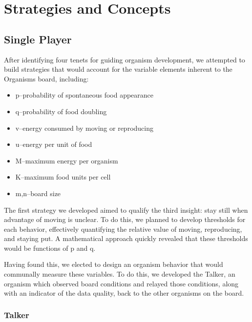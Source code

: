 \section{Strategies and Concepts}
\label{sec:strategies}

\subsection{Single Player}
After identifying four tenets for guiding organism development, we attempted to build strategies that would account for the variable elements inherent to the Organisms board, including:

\begin{itemize}
\item	p--probability of spontaneous food appearance
\item	q--probability of food doubling
\item	v--energy consumed by moving or reproducing
\item	u--energy per unit of food
\item	M--maximum energy per organism
\item	K--maximum food units per cell
\item	m,n--board size
\end{itemize}

The first strategy we developed aimed to qualify the third insight: stay still when advantage of moving is unclear.  To do this, we planned to develop thresholds for each behavior, effectively quantifying the relative value of moving, reproducing, and staying put.  A mathematical approach quickly revealed that these thresholds would be functions of p and q.

Having found this, we elected to design an organism behavior that would communally measure these variables.  To do this, we developed the Talker, an organism which observed board conditions and relayed those conditions, along with an indicator of the data quality, back to the other organisms on the board.


\subsubsection{Talker}

